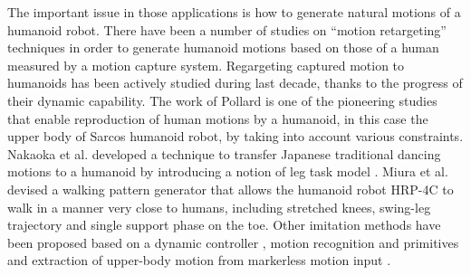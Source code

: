 \documentclass[letterpaper, 10 pt, conference]{ieeeconf}  %
\begin{document}
The important issue in those applications is how to generate natural
motions of a humanoid robot.
There have been a number of studies on ``motion retargeting''
techniques in order to
generate humanoid motions based on those of a human measured by a
motion capture system.
Regargeting captured motion to humanoids has been
actively studied during last decade, thanks to the progress of their
dynamic capability. The work of Pollard \cite{Pollard02ICRA} is one of
the pioneering studies that enable reproduction of human motions
by a humanoid, in this case the upper body of Sarcos humanoid robot,
by taking into account various constraints.
Nakaoka et al. developed a technique to  transfer
Japanese traditional dancing motions  to a humanoid by introducing a
notion of leg task model \cite{nakaoka_icra2004,nakaoka_2007}.
Miura et al. \cite{Miura11IROS} devised a walking pattern generator
that allows the humanoid robot HRP-4C to walk in a manner very close
to humans, including stretched knees, swing-leg trajectory and single
support phase on the toe.
Other imitation methods have been proposed based on a dynamic
controller  \cite{Yamane11humanoids,Ramos11humanoids},
motion recognition and primitives \cite{Ott08humanoids} and
extraction of upper-body motion from markerless motion input
\cite{Dariush08IROS,Do08humanoids}.
\end{document}
